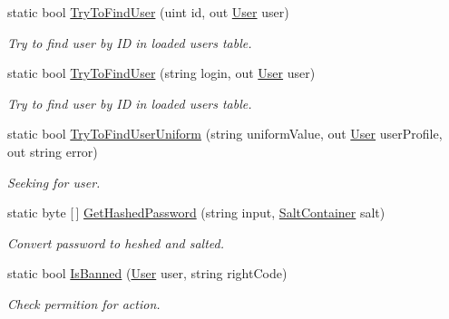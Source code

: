 \begin{DoxyCompactItemize}
static bool \mbox{\hyperlink{class_authority_controller_1_1_a_p_i_1_1_users_abd0e68d6f6f3c77682e995b939daaea9}{Try\+To\+Find\+User}} (uint id, out \mbox{\hyperlink{class_authority_controller_1_1_data_1_1_personal_1_1_user}{User}} user)
\begin{DoxyCompactList}\small\item\em Try to find user by ID in loaded users table. \end{DoxyCompactList}\item 
static bool \mbox{\hyperlink{class_authority_controller_1_1_a_p_i_1_1_users_a3e152e5b11636c72e5e9610906de986a}{Try\+To\+Find\+User}} (string login, out \mbox{\hyperlink{class_authority_controller_1_1_data_1_1_personal_1_1_user}{User}} user)
\begin{DoxyCompactList}\small\item\em Try to find user by ID in loaded users table. \end{DoxyCompactList}\item 
static bool \mbox{\hyperlink{class_authority_controller_1_1_a_p_i_1_1_users_a7890ae58af943645c6b6cfc39f0d3e6f}{Try\+To\+Find\+User\+Uniform}} (string uniform\+Value, out \mbox{\hyperlink{class_authority_controller_1_1_data_1_1_personal_1_1_user}{User}} user\+Profile, out string error)
\begin{DoxyCompactList}\small\item\em Seeking for user. \end{DoxyCompactList}\item 
static byte \mbox{[}$\,$\mbox{]} \mbox{\hyperlink{class_authority_controller_1_1_a_p_i_1_1_users_a49664665cbe97942090a272281c0780a}{Get\+Hashed\+Password}} (string input, \mbox{\hyperlink{class_authority_controller_1_1_data_1_1_application_1_1_salt_container}{Salt\+Container}} salt)
\begin{DoxyCompactList}\small\item\em Convert password to heshed and salted. \end{DoxyCompactList}\item 
static bool \mbox{\hyperlink{class_authority_controller_1_1_a_p_i_1_1_users_ab23c24d29e83e28d25452f7da05b427d}{Is\+Banned}} (\mbox{\hyperlink{class_authority_controller_1_1_data_1_1_personal_1_1_user}{User}} user, string right\+Code)
\begin{DoxyCompactList}\small\item\em Check permition for action. \end{DoxyCompactList}\end{DoxyCompactItemize}
